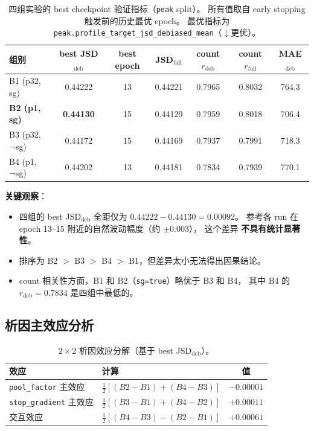 \documentclass[11pt,a4paper]{ctexart}
\begin{document}
\begin{table}[H]
\centering
\small
\caption{四组实验的 best checkpoint 验证指标（\texttt{peak} split）。
  所有值取自 early stopping 触发前的历史最优 epoch。
  最优指标为 \texttt{peak.profile\_target\_jsd\_debiased\_mean}（$\downarrow$更优）。}
\label{tab:best_metrics}
\begin{tabular}{l c c c c c c}
\toprule
组别 & best JSD$_\text{deb}$ & best epoch & JSD$_\text{full}$ & count $r_\text{deb}$ & count $r_\text{full}$ & MAE$_\text{deb}$ \\
\midrule
B1 (p32, sg) & 0.44222 & 13 & 0.44221 & 0.7965 & 0.8032 & 764.3 \\
\textbf{B2 (p1, sg)} & \textbf{0.44130} & 15 & 0.44129 & 0.7959 & 0.8018 & 706.4 \\
B3 (p32, ¬sg) & 0.44172 & 15 & 0.44169 & 0.7937 & 0.7991 & 718.3 \\
B4 (p1, ¬sg) & 0.44202 & 13 & 0.44181 & 0.7834 & 0.7939 & 770.1 \\
\bottomrule
\end{tabular}
\end{table}

\textbf{关键观察}：
\begin{itemize}[leftmargin=2em]
  \item 四组的 best JSD$_\text{deb}$ 全距仅为 $0.44222 - 0.44130 = 0.00092$。
    参考各 run 在 epoch 13--15 附近的自然波动幅度（约 $\pm 0.003$），
    这个差异 \textbf{不具有统计显著性}。
  \item 排序为 B2 $>$ B3 $>$ B4 $>$ B1，但差异太小无法得出因果结论。
  \item count 相关性方面，B1 和 B2（\texttt{sg=true}）略优于 B3 和 B4，
    其中 B4 的 $r_\text{deb}=0.7834$ 是四组中最低的。
\end{itemize}

\subsection{析因主效应分析}

\begin{table}[H]
\centering
\caption{$2 \times 2$ 析因效应分解（基于 best JSD$_\text{deb}$）。}
\label{tab:factorial_effects}
\begin{tabular}{l l c}
\toprule
效应 & 计算 & 值 \\
\midrule
\texttt{pool\_factor} 主效应 & $\frac{1}{2}[(B2-B1) + (B4-B3)]$ & $-0.00001$ \\
\texttt{stop\_gradient} 主效应 & $\frac{1}{2}[(B3-B1) + (B4-B2)]$ & $+0.00011$ \\
交互效应 & $\frac{1}{2}[(B4-B3) - (B2-B1)]$ & $+0.00061$ \\
\bottomrule
\end{tabular}
\end{table}
\end{document}
